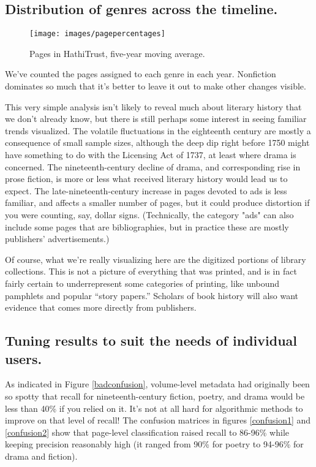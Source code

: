\documentclass[paper=a4, fontsize=12pt]{scrartcl}
\numberwithin{equation}{section}		%
\numberwithin{figure}{section}			%
\numberwithin{table}{section}				%
\begin{document}
\subsection{Distribution of genres across the timeline.}

\begin{figure}[!h]
\centering
\texttt{[image: images/pagepercentages]}
\caption{Pages in HathiTrust, five-year moving average.}
\label{genreproportions}
\end{figure}

We've counted the pages assigned to each genre in each year. Nonfiction dominates so much that it's better to leave it out to make other changes visible.

This very simple analysis isn't likely to reveal much about literary history that we don't already know, but there is still perhaps some interest in seeing familiar trends visualized. The volatile fluctuations in the eighteenth century are mostly a consequence of small sample sizes, although the deep dip right before 1750 might have something to do with the Licensing Act of 1737, at least where drama is concerned. The nineteenth-century decline of drama, and corresponding rise in prose fiction, is more or less what received literary history would lead us to expect. The late-nineteenth-century increase in pages devoted to ads is less familiar, and affects a smaller number of pages, but it could produce distortion if you were counting, say, dollar signs. (Technically, the category "ads" can also include some pages that are bibliographies, but in practice these are mostly publishers' advertisements.)

Of course, what we're really visualizing here are the digitized portions of library collections. This is not a picture of everything that was printed, and is in fact fairly certain to underrepresent some categories of printing, like unbound pamphlets and popular ``story papers.'' Scholars of book history will also want evidence that comes more directly from publishers.

\newpage
\subsection{Tuning results to suit the needs of individual users.}
\label{sec:eval}

As indicated in Figure \ref{badconfusion}, volume-level metadata had originally been so spotty that recall for nineteenth-century fiction, poetry, and drama would be less than 40\% if you relied on it. It's not at all hard for algorithmic methods to improve on that level of recall! The confusion matrices in figures \ref{confusion1} and \ref{confusion2} show that page-level classification raised recall to 86-96\% while keeping precision reasonably high (it ranged from 90\% for poetry to 94-96\% for drama and fiction).
\end{document}
